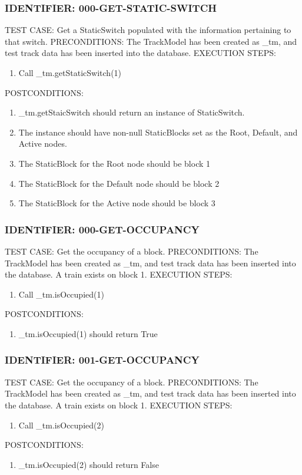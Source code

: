 \documentclass{scrreprt}
\begin{document}
\subsubsection{IDENTIFIER: 000-GET-STATIC-SWITCH}
TEST CASE: Get a StaticSwitch populated with the information pertaining to that switch.
PRECONDITIONS: The TrackModel has been created as _tm, and test track data has been inserted into the database.
EXECUTION STEPS:
\begin{enumerate}
	\item Call _tm.getStaticSwitch(1)
\end{enumerate}
POSTCONDITIONS:
\begin{enumerate}
	\item _tm.getStaicSwitch should return an instance of StaticSwitch.
	\item The instance should have non-null StaticBlocks set as the Root, Default, and Active nodes.
	\item The StaticBlock for the Root node should be block 1
	\item The StaticBlock for the Default node should be block 2
	\item The StaticBlock for the Active node should be block 3
\end{enumerate}

\subsubsection{IDENTIFIER: 000-GET-OCCUPANCY}
TEST CASE: Get the occupancy of a block.
PRECONDITIONS: The TrackModel has been created as _tm, and test track data has been inserted into the database. A train exists on block 1.
EXECUTION STEPS:
\begin{enumerate}
	\item Call _tm.isOccupied(1)
\end{enumerate}
POSTCONDITIONS:
\begin{enumerate}
	\item _tm.isOccupied(1) should return True
\end{enumerate}

\subsubsection{IDENTIFIER: 001-GET-OCCUPANCY}
TEST CASE: Get the occupancy of a block.
PRECONDITIONS: The TrackModel has been created as _tm, and test track data has been inserted into the database. A train exists on block 1.
EXECUTION STEPS:
\begin{enumerate}
	\item Call _tm.isOccupied(2)
\end{enumerate}
POSTCONDITIONS:
\begin{enumerate}
	\item _tm.isOccupied(2) should return False
\end{enumerate}
\end{document}
